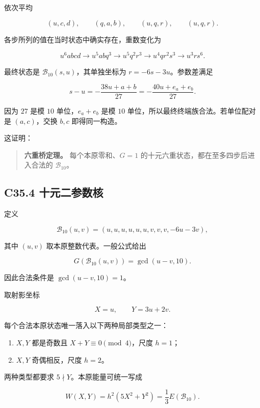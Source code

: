 {依次平均}

\[
(u,c,d),\qquad(q,a,b),\qquad(u,q,r),\qquad(u,q,r).
\]

{各步所列的值在当时状态中确实存在，重数变化为}

\[
u^6abcd
\longrightarrow u^5abq^3
\longrightarrow u^5q^2r^3
\longrightarrow u^4qr^2s^3
\longrightarrow u^3rs^6.
\]

{最终状态是} \(\mathcal B_{10}(s,u)\){，其单独坐标为} \(r=-6s-3u\){。参数差满足}

\[
s-u=-\frac{38u+a+b}{27}
=-\frac{40u+e_a+e_b}{27}.
\]

{因为} \(27\) {是模} \(10\) {单位，}\(e_a+e_b\) {是模} \(10\) {单位，所以最终终端族合法。若单位配对是} \((a,c)\){，交换} \(b,c\) {即得同一构造。}

{这证明：}

\begin{quote}
\textbf{{六重桥定理。}} {每个本原零和、}\(G=1\) {的十元六重状态，都在至多四步后进入合法的} \(\mathcal B_{10}\){。}
\end{quote}

\subsection*{\texorpdfstring{{C35.4} {十元二参数核}}{C35.4 十元二参数核}}\label{C35-h236}

{定义}

\[
\mathcal B_{10}(u,v)
=(u,u,u,u,u,u,v,v,v,-6u-3v),
\]

{其中} \((u,v)\) {取本原整数代表。一般公式给出}

\[
G(\mathcal B_{10}(u,v))=\gcd(u-v,10).
\]

{因此合法条件是} \(\gcd(u-v,10)=1\){。}

{取射影坐标}

\[
X=u,\qquad Y=3u+2v.
\]

{每个合法本原状态唯一落入以下两种局部类型之一：}

\begin{enumerate}
\def\labelenumi{\arabic{enumi}.}
\tightlist
\item
  \(X,Y\) {都是奇数且} \(X+Y\equiv0\pmod4\){，尺度} \(h=1\){；}
\item
  \(X,Y\) {奇偶相反，尺度} \(h=2\){。}
\end{enumerate}

{两种类型都要求} \(5\nmid Y\){。本原能量可统一写成}

\[
W(X,Y)=h^2(5X^2+Y^2)=\frac13E(\mathcal B_{10}).
\tag{C35.4.1}
\]

